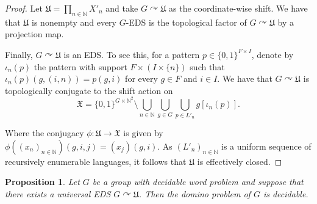 \documentclass{article}
\newtheorem{proposition}[theorem]{Proposition}
\theoremstyle{definition}
\theoremstyle{plain}
\newcommand{\NN}{\mathbb{N}}
\begin{document}
\begin{proof}
    Let $\mathfrak{U}=\prod_{n \in \NN}X'_n$ and take $G\curvearrowright \mathfrak{U}$ as the coordinate-wise shift. We have that $\mathfrak{U}$ is nonempty and every $G$-EDS is the topological factor of $G\curvearrowright \mathfrak{U}$ by a projection map.

    Finally, $G\curvearrowright \mathfrak{U}$ is an EDS. To see this, for a pattern $p \in \{0,1\}^{F\times I}$, denote by $\iota_n(p)$ the pattern with support $F\times (I\times \{n\})$ such that $\iota_n(p) (g,(i,n))= p(g,i)$ for every $g\in F$ and $i \in I$. We have that $G\curvearrowright \mathfrak{U}$ is topologically conjugate to the shift action on
\[  \mathfrak{X} = \{0,1\}^{G \times \NN^2}\setminus \bigcup_{n \in \NN}\bigcup_{g \in G}\bigcup_{p \in L'_n}g[\iota_n(p)]. \]

Where the conjugacy $\phi\colon \mathfrak{U}\to \mathfrak{X}$ is given by $\phi( (x_n)_{n \in \NN})(g,i,j) = (x_j)(g,i)$. As $(L'_n)_{n \in \NN}$ is a uniform sequence of recursively enumerable languages, it follows that $\mathfrak{U}$ is effectively closed.\end{proof}


\begin{proposition}\label{prop:undec_DP}
   Let $G$ be a group with decidable word problem and suppose that there exists a universal EDS $G\curvearrowright \mathfrak{U}$. Then the domino problem of $G$ is decidable.
\end{proposition}

\end{document}
